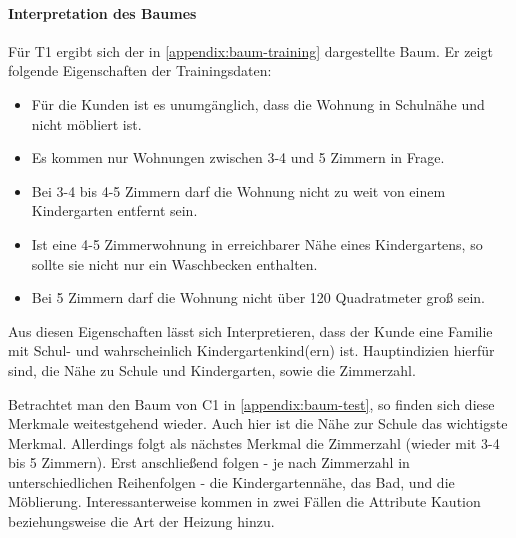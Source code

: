\paragraph{Interpretation des Baumes}
Für T1 ergibt sich der in \autoref{appendix:baum-training} dargestellte Baum.
Er zeigt folgende Eigenschaften der Trainingsdaten:
\begin{itemize}
    \item Für die Kunden ist es unumgänglich, dass die Wohnung in Schulnähe und nicht möbliert ist.
    \item Es kommen nur Wohnungen zwischen 3-4 und 5 Zimmern in Frage.
    \item Bei 3-4 bis 4-5 Zimmern darf die Wohnung nicht zu weit von einem Kindergarten entfernt sein.
    \item Ist eine 4-5 Zimmerwohnung in erreichbarer Nähe eines Kindergartens, so sollte sie nicht nur ein Waschbecken enthalten.
    \item Bei 5 Zimmern darf die Wohnung nicht über 120 Quadratmeter groß sein.
\end{itemize}

Aus diesen Eigenschaften lässt sich Interpretieren,
dass der Kunde eine Familie mit Schul- und wahrscheinlich Kindergartenkind(ern) ist.
Hauptindizien hierfür sind, die Nähe zu Schule und Kindergarten, sowie die Zimmerzahl.


Betrachtet man den Baum von C1 in \autoref{appendix:baum-test},
so finden sich diese Merkmale weitestgehend wieder.
Auch hier ist die Nähe zur Schule das wichtigste Merkmal.
Allerdings folgt als nächstes Merkmal die Zimmerzahl (wieder mit 3-4 bis 5 Zimmern).
Erst anschließend folgen - je nach Zimmerzahl in unterschiedlichen Reihenfolgen - die Kindergartennähe,
das Bad, und die Möblierung.
Interessanterweise kommen in zwei Fällen die Attribute Kaution beziehungsweise die Art der Heizung hinzu.
